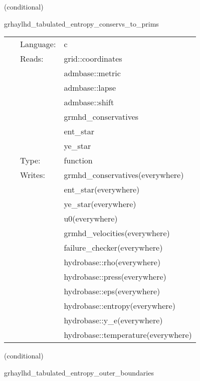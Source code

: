\documentclass{article}
\begin{document}
\vspace{5mm}

   (conditional) 

\hspace{5mm} grhaylhd\_tabulated\_entropy\_conservs\_to\_prims 

\hspace{5mm}{\it entropy+tabulated version of grhaylhd\_conservs\_to\_prims } 


\hspace{5mm}

 \begin{tabular*}{160mm}{cll} 
~ & Language:  & c \\ 
~ & Reads:  & grid::coordinates \\ 
~& ~ &admbase::metric\\ 
~& ~ &admbase::lapse\\ 
~& ~ &admbase::shift\\ 
~& ~ &grmhd\_conservatives\\ 
~& ~ &ent\_star\\ 
~& ~ &ye\_star\\ 
~ & Type:  & function \\ 
~ & Writes:  & grmhd\_conservatives(everywhere) \\ 
~& ~ &ent\_star(everywhere)\\ 
~& ~ &ye\_star(everywhere)\\ 
~& ~ &u0(everywhere)\\ 
~& ~ &grmhd\_velocities(everywhere)\\ 
~& ~ &failure\_checker(everywhere)\\ 
~& ~ &hydrobase::rho(everywhere)\\ 
~& ~ &hydrobase::press(everywhere)\\ 
~& ~ &hydrobase::eps(everywhere)\\ 
~& ~ &hydrobase::entropy(everywhere)\\ 
~& ~ &hydrobase::y\_e(everywhere)\\ 
~& ~ &hydrobase::temperature(everywhere)\\ 
\end{tabular*} 


\vspace{5mm}

   (conditional) 

\hspace{5mm} grhaylhd\_tabulated\_entropy\_outer\_boundaries 
\end{document}
